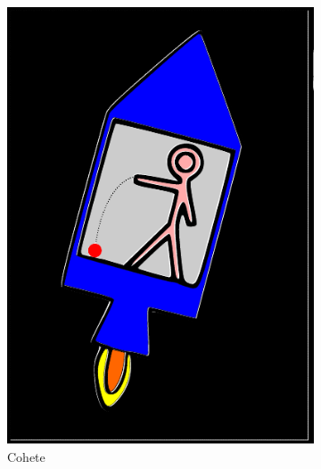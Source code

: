 \begin{figure}[!ht]
\centering
\begin{subfigure}{0.3\textwidth}
\includegraphics[width=\textwidth]{images/principio-equivalencia-1.pdf}
\caption{Cohete}
\end{subfigure}
\begin{subfigure}{0.3\textwidth}

\end{subfigure}
\end{figure}
